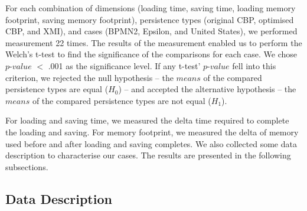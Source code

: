 \documentclass{llncs}
\begin{document}
{    For each combination of dimensions (loading time, saving time, loading memory footprint, saving memory footprint),  persistence types (original CBP, optimised CBP, and XMI), and cases (BPMN2, Epsilon, and United States), we performed measurement 22 times. The results of the measurement enabled us to perform the Welch's t-test \cite{welch1947ttest} to find the significance of the comparisons for each case. We chose $p$-$value$ $<$ .001 as the significance level. If any t-test' $p$-$value$ fell into this criterion, we rejected the null hypothesis -- the $means$ of the compared persistence types are equal ($H_0$) -- and accepted the alternative hypothesis -- the $means$ of the compared persistence types are not equal ($H_1$).
    
     For loading and saving time, we measured the delta time required to complete the loading and saving. For memory footprint, we measured the delta of memory used before and after loading and saving completes. We also collected some data description to characterise our cases. The results are presented in the following subsections.

\vspace{-10pt}
\subsection{Data Description}
\label{subsec:data_description}

}
\end{document}
